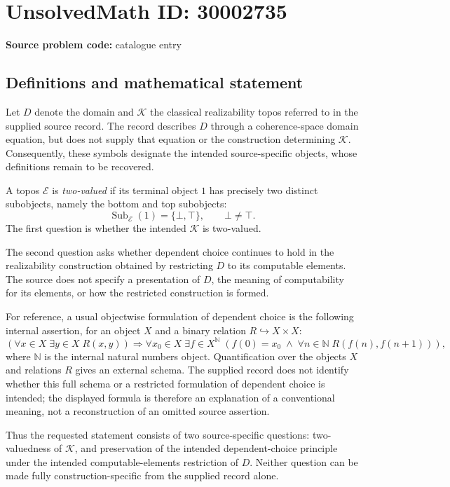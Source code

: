 \documentclass[11pt]{article}
\begin{document}
\section*{UnsolvedMath ID: 30002735}
\textbf{Source problem code:} catalogue entry
\subsection{Definitions and mathematical statement}
Let \(D\) denote the domain and \(\mathcal K\) the classical realizability topos referred to in the supplied source record. The record describes \(D\) through a coherence-space domain equation, but does not supply that equation or the construction determining \(\mathcal K\). Consequently, these symbols designate the intended source-specific objects, whose definitions remain to be recovered.

A topos \(\mathcal E\) is \emph{two-valued} if its terminal object \(1\) has precisely two distinct subobjects, namely the bottom and top subobjects:
\[
\operatorname{Sub}_{\mathcal E}(1)=\{\bot,\top\},\qquad \bot\ne\top.
\]
The first question is whether the intended \(\mathcal K\) is two-valued.

The second question asks whether dependent choice continues to hold in the realizability construction obtained by restricting \(D\) to its computable elements. The source does not specify a presentation of \(D\), the meaning of computability for its elements, or how the restricted construction is formed.

For reference, a usual objectwise formulation of dependent choice is the following internal assertion, for an object \(X\) and a binary relation \(R\hookrightarrow X\times X\):
\[
\left(\forall x\in X\;\exists y\in X\;R(x,y)\right)
\Longrightarrow
\forall x_0\in X\;\exists f\in X^{\mathbb N}\;
\left(f(0)=x_0\;\land\;\forall n\in\mathbb N\;R(f(n),f(n+1))\right),
\]
where \(\mathbb N\) is the internal natural numbers object. Quantification over the objects \(X\) and relations \(R\) gives an external schema. The supplied record does not identify whether this full schema or a restricted formulation of dependent choice is intended; the displayed formula is therefore an explanation of a conventional meaning, not a reconstruction of an omitted source assertion.

Thus the requested statement consists of two source-specific questions: two-valuedness of \(\mathcal K\), and preservation of the intended dependent-choice principle under the intended computable-elements restriction of \(D\). Neither question can be made fully construction-specific from the supplied record alone.
\end{document}
